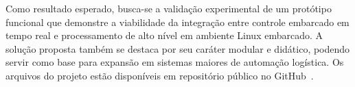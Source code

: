 Como resultado esperado, busca-se a validação experimental de um protótipo funcional que demonstre a viabilidade da integração entre controle embarcado em tempo real e processamento de alto nível em ambiente Linux embarcado. A solução proposta também se destaca por seu caráter modular e didático, podendo servir como base para expansão em sistemas maiores de automação logística. Os arquivos do projeto estão disponíveis em repositório público no GitHub~\cite{ref:github_soe}.
